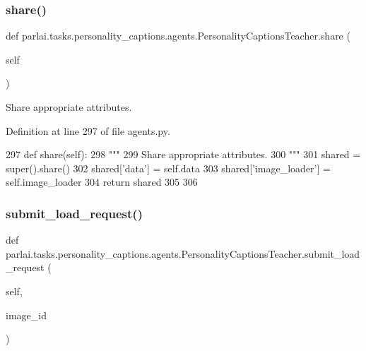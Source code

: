 \subsubsection{\texorpdfstring{share()}{share()}}
{\footnotesize\ttfamily def parlai.\+tasks.\+personality\+\_\+captions.\+agents.\+Personality\+Captions\+Teacher.\+share (\begin{DoxyParamCaption}\item[{}]{self }\end{DoxyParamCaption})}

\begin{DoxyVerb}Share appropriate attributes.
\end{DoxyVerb}
 

Definition at line 297 of file agents.\+py.


\begin{DoxyCode}
297     \textcolor{keyword}{def }share(self):
298         \textcolor{stringliteral}{"""}
299 \textcolor{stringliteral}{        Share appropriate attributes.}
300 \textcolor{stringliteral}{        """}
301         shared = super().share()
302         shared[\textcolor{stringliteral}{'data'}] = self.data
303         shared[\textcolor{stringliteral}{'image\_loader'}] = self.image\_loader
304         \textcolor{keywordflow}{return} shared
305 
306 
\end{DoxyCode}
\mbox{\label{classparlai_1_1tasks_1_1personality__captions_1_1agents_1_1PersonalityCaptionsTeacher_a8b15a0281c0e15c0f4af16da820f7a52}} 
\subsubsection{\texorpdfstring{submit\+\_\+load\+\_\+request()}{submit\_load\_request()}}
{\footnotesize\ttfamily def parlai.\+tasks.\+personality\+\_\+captions.\+agents.\+Personality\+Captions\+Teacher.\+submit\+\_\+load\+\_\+request (\begin{DoxyParamCaption}\item[{}]{self,  }\item[{}]{image\+\_\+id }\end{DoxyParamCaption})}

